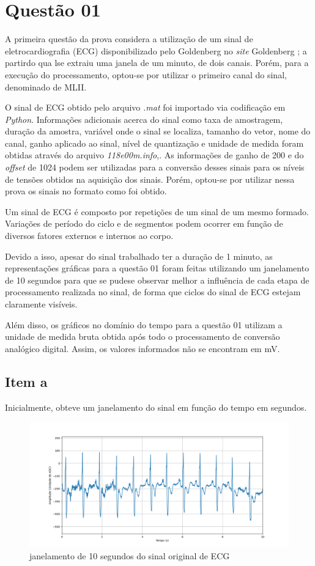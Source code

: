 \section{Questão 01}

A primeira questão da prova considera a utilização de um sinal de eletrocardiografia (ECG) disponibilizado pelo Goldenberg no \textit{site} Goldenberg \cite{Goldberger2000}; a partirdo qua lse  extraiu uma janela de um minuto, de dois canais. Porém, para a execução do processamento, optou-se por utilizar o primeiro canal do sinal, denominado de MLII.

O sinal de ECG obtido pelo arquivo \textit{.mat} foi importado via codificação em \textit{Python}. Informações adicionais acerca do sinal como taxa de amostragem, duração da amostra, variável onde o sinal se localiza, tamanho do vetor, nome do canal, ganho aplicado ao sinal, nível de quantização e unidade de medida foram obtidas através do arquivo \textit{118e00m.info},. As informações de ganho de 200 e do \textit{offset} de 1024 podem ser utilizadas para a conversão desses sinais para os níveis de tensões obtidos na aquisição dos sinais. Porém, optou-se por utilizar nessa prova os sinais no formato como foi obtido.

Um sinal de ECG é composto por repetições de um sinal de um mesmo formado. Variações de período do ciclo e de segmentos podem ocorrer em função de diversos fatores externos e internos ao corpo. 

Devido a isso, apesar do sinal trabalhado ter a duração de 1 minuto, as representações gráficas para a questão 01 foram feitas utilizando um janelamento de 10 segundos para que se pudese observar melhor a influência de cada etapa de processamento realizada no sinal, de forma que ciclos do sinal de ECG estejam claramente visíveis. 

Além disso, os gráficos no domínio do tempo para a questão 01 utilizam a unidade de medida bruta obtida após todo o processamento de conversão analógico digital. Assim, os valores informados não se encontram em mV.
\subsection{Item a}
Inicialmente, obteve um janelamento do sinal em função do tempo em segundos.

\begin{figure}[!htb]
    \centering
    \includegraphics[width=\linewidth]{Imagens/fig01.png}
    \caption{janelamento de 10 segundos do sinal original de ECG}
    \label{fig:graph_01}
\end{figure}

